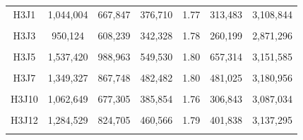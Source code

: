 \documentclass[
  a4paper,
  titlepage]{article}
\begin{document}
\begin{longtable}[t]{ccccccc}
H3J1 & 1,044,004 & 667,847 & 376,710 & 1.77 & 313,483 & 3,108,844\\
 
\cellcolor{gray!6}{H3J2} & \cellcolor{gray!6}{1,046,299} & \cellcolor{gray!6}{665,488} & \cellcolor{gray!6}{381,268} & \cellcolor{gray!6}{1.75} & \cellcolor{gray!6}{285,990} & \cellcolor{gray!6}{2,939,314}\\
 
H3J3 & 950,124 & 608,239 & 342,328 & 1.78 & 260,199 & 2,871,296\\
 
\cellcolor{gray!6}{H3J4} & \cellcolor{gray!6}{1,034,047} & \cellcolor{gray!6}{662,404} & \cellcolor{gray!6}{372,076} & \cellcolor{gray!6}{1.78} & \cellcolor{gray!6}{285,091} & \cellcolor{gray!6}{2,851,734}\\
 
H3J5 & 1,537,420 & 988,963 & 549,530 & 1.80 & 657,314 & 3,151,585\\
 
\cellcolor{gray!6}{H3J6} & \cellcolor{gray!6}{1,256,080} & \cellcolor{gray!6}{804,639} & \cellcolor{gray!6}{452,173} & \cellcolor{gray!6}{1.78} & \cellcolor{gray!6}{450,368} & \cellcolor{gray!6}{3,083,513}\\
 
H3J7 & 1,349,327 & 867,748 & 482,482 & 1.80 & 481,025 & 3,180,956\\
 
\cellcolor{gray!6}{H3J8} & \cellcolor{gray!6}{1,186,816} & \cellcolor{gray!6}{766,620} & \cellcolor{gray!6}{420,850} & \cellcolor{gray!6}{1.82} & \cellcolor{gray!6}{423,517} & \cellcolor{gray!6}{2,981,030}\\
 
H3J10 & 1,062,649 & 677,305 & 385,854 & 1.76 & 306,843 & 3,087,034\\
 
\cellcolor{gray!6}{H3J11} & \cellcolor{gray!6}{1,244,928} & \cellcolor{gray!6}{803,931} & \cellcolor{gray!6}{441,758} & \cellcolor{gray!6}{1.82} & \cellcolor{gray!6}{423,932} & \cellcolor{gray!6}{2,953,747}\\
 
H3J12 & 1,284,529 & 824,705 & 460,566 & 1.79 & 401,838 & 3,137,295\\
 
\cellcolor{gray!6}{H3J13} & \cellcolor{gray!6}{1,282,927} & \cellcolor{gray!6}{826,115} & \cellcolor{gray!6}{457,572} & \cellcolor{gray!6}{1.81} & \cellcolor{gray!6}{427,989} & \cellcolor{gray!6}{2,998,097}\\
 

\end{longtable}
\end{document}
